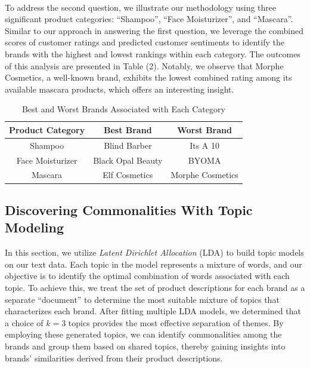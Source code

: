 \documentclass[10pt]{article}
\begin{document}
\

To address the second question, we illustrate our methodology using three significant product categories: ``Shampoo'', ``Face Moisturizer'', and ``Mascara''. Similar to our approach in answering the first question, we leverage the combined scores of customer ratings and predicted customer sentiments to identify the brands with the highest and lowest rankings within each category. The outcomes of this analysis are presented in Table (2). Notably, we observe that Morphe Cosmetics, a well-known brand, exhibits the lowest combined rating among its available mascara products, which offers an interesting insight.

\begin{table}[h!]
    \centering
    \begin{tabular}{| c | c | c |} 
    \hline
    \textbf{Product Category} & \textbf{Best Brand} & \textbf{Worst Brand} \\ 
    \hline
    \hline
    Shampoo & Blind Barber & Its A 10 \\
    \hline
    Face Moisturizer & Black Opal Beauty & BYOMA \\
    \hline  
    Mascara & Elf Cosmetics & Morphe Cosmetics \\
    \hline  
    \end{tabular}
    \caption{Best and Worst Brands Associated with Each Category}
\end{table}

\subsection{Discovering Commonalities With Topic Modeling}

In this section, we utilize \textit{Latent Dirichlet Allocation} (LDA) to build topic models on our text data. Each topic in the model represents a mixture of words, and our objective is to identify the optimal combination of words associated with each topic. To achieve this, we treat the set of product descriptions for each brand as a separate ``document'' to determine the most suitable mixture of topics that characterizes each brand. After fitting multiple LDA models, we determined that a choice of $k=3$ topics provides the most effective separation of themes. By employing these generated topics, we can identify commonalities among the brands and group them based on shared topics, thereby gaining insights into brands' similarities derived from their product descriptions.
\end{document}
